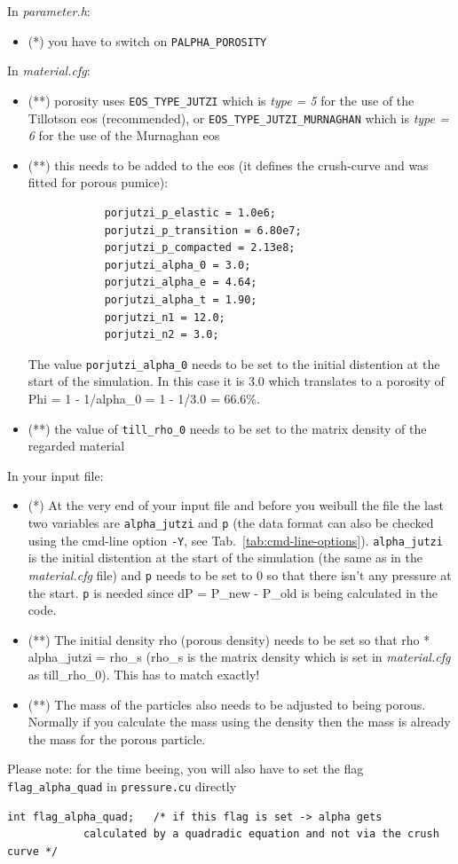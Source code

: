\documentclass[10pt,fleqn,twoside]{article}
\begin{document}
In \emph{parameter.h}:
\begin{itemize}
 \item (*) you have to switch on \verb|PALPHA_POROSITY|
\end{itemize}

In \emph{material.cfg}:
\begin{itemize}
 \item (**) porosity uses \verb|EOS_TYPE_JUTZI| which is \emph{type = 5} for the use of the Tillotson eos (recommended), or \verb|EOS_TYPE_JUTZI_MURNAGHAN| which is \emph{type = 6} for the use of the Murnaghan eos
 \item (**) this needs to be added to the eos (it defines the crush-curve and was fitted for porous pumice):
       \begin{verbatim}
            porjutzi_p_elastic = 1.0e6;
            porjutzi_p_transition = 6.80e7;
            porjutzi_p_compacted = 2.13e8;
            porjutzi_alpha_0 = 3.0;
            porjutzi_alpha_e = 4.64;
            porjutzi_alpha_t = 1.90;
            porjutzi_n1 = 12.0;
            porjutzi_n2 = 3.0;
\end{verbatim}
       The value \verb|porjutzi_alpha_0| needs to be set to the initial distention at the start of the simulation. In this case it is 3.0 which translates to a porosity of Phi = 1 - 1/alpha\_0 = 1 - 1/3.0 = 66.6\%.
 \item (**) the value of \verb|till_rho_0| needs to be set to the matrix density of the regarded material
\end{itemize}

In your input file:
\begin{itemize}
 \item (*) At the very end of your input file and before you weibull the file the last two variables are \verb|alpha_jutzi| and \verb|p| (the data format can also be checked using the cmd-line option \verb|-Y|, see Tab.~\ref{tab:cmd-line-options}). \verb|alpha_jutzi| is the initial distention at the start of the simulation (the same as in the \emph{material.cfg} file) and \verb|p| needs to be set to 0 so that there isn't any pressure at the start. \verb|p| is needed since dP = P\_new - P\_old is being calculated in the code.
 \item (**) The initial density rho (porous density) needs to be set so that rho * alpha\_jutzi = rho\_s (rho\_s is the matrix density which is set in \emph{material.cfg} as till\_rho\_0). This has to match exactly!
 \item (**) The mass of the particles also needs to be adjusted to being porous. Normally if you calculate the mass using the density then the mass is already the mass for the porous particle.
\end{itemize}
Please note: for the time beeing, you will also have to set the flag \texttt{flag\_alpha\_quad} in \texttt{pressure.cu} directly
\begin{verbatim}
int flag_alpha_quad;   /* if this flag is set -> alpha gets
            calculated by a quadradic equation and not via the crush curve */
\end{verbatim}
\end{document}
